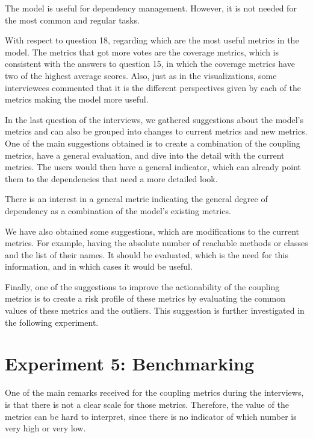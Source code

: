\begin{finding}
	The model is useful for dependency management. However, it is not needed for the most common and regular tasks.
	\label{find:model-useful}
\end{finding}

With respect to question 18, regarding which are the most useful metrics in the model. The metrics that got more votes are the coverage metrics, which is consistent with the answers to question 15, in which the coverage metrics have two of the highest average scores. Also, just as in the visualizations, some interviewees commented that it is the different perspectives given by each of the metrics making the model more useful.

In the last question of the interviews, we gathered suggestions about the model's metrics and can also be grouped into changes to current metrics and new metrics. One of the main suggestions obtained is to create a combination of the coupling metrics, have a general evaluation, and dive into the detail with the current metrics. The users would then have a general indicator, which can already point them to the dependencies that need a more detailed look.

\begin{finding}
	There is an interest in a general metric indicating the general degree of dependency as a combination of the model's existing metrics.
	\label{find:general-metric}
\end{finding}

We have also obtained some suggestions, which are modifications to the current metrics. For example, having the absolute number of reachable methods or classes and the list of their names. It should be evaluated, which is the need for this information, and in which cases it would be useful.

Finally, one of the suggestions to improve the actionability of the coupling metrics is to create a risk profile of these metrics by evaluating the common values of these metrics and the outliers. This suggestion is further investigated in the following experiment.

\section{Experiment 5: Benchmarking}
One of the main remarks received for the coupling metrics during the interviews, is that there is not a clear scale for those metrics. Therefore, the value of the metrics can be hard to interpret, since there is no indicator of which number is very high or very low.

